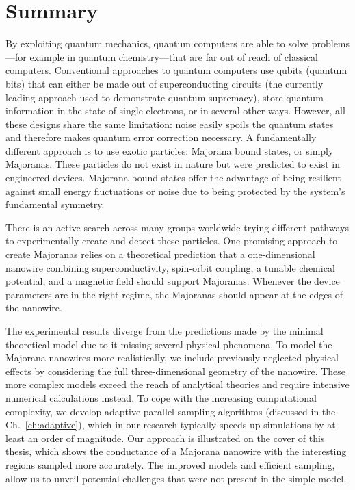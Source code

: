 \chapter*{Summary}

By exploiting quantum mechanics, quantum computers are able to solve problems---for example in quantum chemistry---that are far out of reach of classical computers.
Conventional approaches to quantum computers use qubits (quantum bits) that can either be made out of superconducting circuits (the currently leading approach used to demonstrate quantum supremacy), store quantum information in the state of single electrons, or in several other ways.
However, all these designs share the same limitation: noise easily spoils the quantum states and therefore makes quantum error correction necessary.
A fundamentally different approach is to use exotic particles: Majorana bound states, or simply Majoranas.
These particles do not exist in nature but were predicted to exist in engineered devices.
Majorana bound states offer the advantage of being resilient against small energy fluctuations or noise due to being protected by the system's fundamental symmetry.

There is an active search across many groups worldwide trying different pathways to experimentally create and detect these particles.
One promising approach to create Majoranas relies on a theoretical prediction that a one-dimensional nanowire combining superconductivity, spin-orbit coupling, a tunable chemical potential, and a magnetic field should support Majoranas.
Whenever the device parameters are in the right regime, the Majoranas should appear at the edges of the nanowire.

The experimental results diverge from the predictions made by the minimal theoretical model due to it missing several physical phenomena.
To model the Majorana nanowires more realistically, we include previously neglected physical effects by considering the full three-dimensional geometry of the nanowire.
These more complex models exceed the reach of analytical theories and require intensive numerical calculations instead.
To cope with the increasing computational complexity, we develop adaptive parallel sampling algorithms (discussed in the Ch.~\ref{ch:adaptive}), which in our research typically speeds up simulations by at least an order of magnitude.
Our approach is illustrated on the cover of this thesis, which shows the conductance of a Majorana nanowire with the interesting regions sampled more accurately.
The improved models and efficient sampling, allow us to unveil potential challenges that were not present in the simple model.

